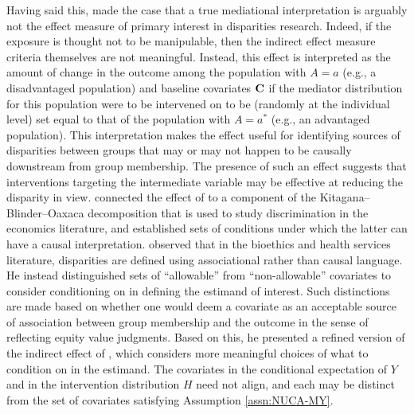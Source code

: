 \documentclass[12pt]{article}
\begin{document}
Having said this, \cite{vanderweele2017mediation} made the case that a true mediational interpretation is arguably not the effect measure of primary interest in disparities research. Indeed, if the exposure is thought not to be manipulable, then the indirect effect measure criteria themselves are not meaningful. Instead, this effect is interpreted as the amount of change in the outcome among the population with $A=a$ (e.g., a disadvantaged population) and baseline covariates $\bf C$ if the mediator distribution for this population were to be intervened on to be (randomly at the individual level) set equal to that of the population with $A=a^*$ (e.g., an advantaged population). This interpretation makes the effect useful for identifying sources of disparities between groups that may or may not happen to be causally downstream from group membership. The presence of such an effect suggests that interventions targeting the intermediate variable may be effective at reducing the disparity in view. \cite{jackson2018decomposition} connected the effect of \cite{vanderweele2014causal} to a component of the Kitagana--Blinder--Oaxaca decomposition \citep{kitagawa1955components, blinder1973wage, oaxaca1973male} that is used to study discrimination in the economics literature, and established sets of conditions under which the latter can have a causal interpretation. \cite{jackson2020meaningful} observed that in the bioethics and health services literature, disparities are defined using associational rather than causal language. He instead distinguished sets of ``allowable'' from ``non-allowable'' covariates to consider conditioning on in defining the estimand of interest. Such distinctions are made based on whether one would deem a covariate as an acceptable source of association between group membership and the outcome in the sense of reflecting equity value judgments. Based on this, he presented a refined version of the indirect effect of \cite{vanderweele2014causal}, which considers more meaningful choices of what to condition on in the estimand. The covariates in the conditional expectation of $Y$ and in the intervention distribution $H$ need not align, and each may be distinct from the set of covariates satisfying Assumption \ref{assn:NUCA-MY}. 

\end{document}
